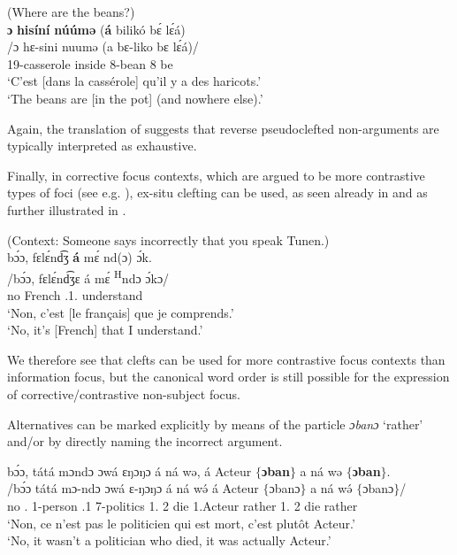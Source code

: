 \documentclass[output=paper,colorlinks,citecolor=brown
]{langscibook}
\begin{document}
\z
\z

\ea
\label{beansfragment}
(Where are the beans?) \\
\glll
{\db}\textbf{ɔ}	\textbf{hisíní}	\textbf{núúmə} (\textbf{á}	bilikó	bɛ́ lɛ́á) \\
/ɔ	hɛ-sini	nuumə	(a	bɛ-liko	bɛ lɛ́á)/ \\
{\db}\PREP{}	19-casserole	inside	\COP{}	8-bean	 8\SM{} be \\
\glt
`C'est [dans la cassérole]\textsubscript{\FOC{}} qu'il y a des haricots.' \\ `The beans are [in the pot]\textsubscript{\FOC{}} (and nowhere else).' \jambox*{[PM 477] }

\z 

Again, the translation of  suggests that reverse pseudoclefted non\hyp arguments are typically interpreted as exhaustive.


Finally, in corrective focus contexts, which are argued to be more contrastive types of foci (see e.g. \citealt{Cruschina2021}), ex-situ clefting can be used, as seen already in  and as further illustrated in .

\ea
\label{speakfrench}
(Context: Someone says incorrectly that you speak Tunen.) \\ 
\glll
{\db}bɔ́ɔ, fɛlɛ́nd͡ʒ \textbf{á} mɛ́ nd(ɔ) ɔ́k. \\
/bɔ́ɔ, fɛlɛ́nd͡ʒɛ á mɛ́ \textsuperscript{H}ndɔ ɔ́kɔ/ \\
{\db}no French \COP{} \SM{}.1\SG{}.\REL{} \PRS{} understand \\
\glt
`Non, c'est [le français]\textsubscript{\FOC{}} que je comprends.' \\  `No, it's [French]\textsubscript{\FOC{}} that I understand.' \jambox*{[PM 93--4] }

\z

We therefore see that clefts can be used for more contrastive focus contexts than information focus, but the canonical word order is still possible for the expression of corrective/contrastive non-subject focus.

Alternatives can be marked explicitly by means of the particle \textit{ɔbanɔ} `rather' and/or by directly naming the incorrect argument.

\ea
\glll
{\db}bɔ́ɔ, tátá mɔndɔ ɔwá ɛŋɔŋɔ á ná wə, á Acteur $\{$\textbf{ɔban}$\}$ a ná wə $\{$\textbf{ɔban}$\}$. \\
/bɔ́ɔ tátá mɔ-ndɔ ɔwá ɛ-ŋɔŋɔ á ná wə́ á Acteur $\{$ɔbanɔ$\}$ a ná wə́ $\{$ɔbanɔ$\}$/ \\
{\db}no \COP{}.\NEG{} 1-person \REL{}.1{} 7-politics 1\SM{}.\REL{} \PST{}2{} die \COP{} 1.Acteur rather 1\SM{}.\REL{} \PST{}2{} die rather \\
\glt
`Non, ce n'est pas le politicien qui est mort, c'est plutôt Acteur.'  \\  `No, it wasn't a politician who died, it was actually Acteur.'  \jambox*{[EE+GE+PB 2716] }
\end{document}
